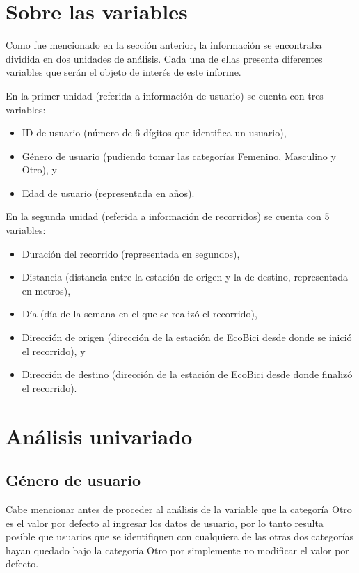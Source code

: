 \documentclass[11pt]{article}
\begin{document}
\section{Sobre las variables}
Como fue mencionado en la secci\'on anterior, la informaci\'on se encontraba dividida en dos unidades de an\'alisis.
Cada una de ellas presenta diferentes variables que ser\'an el objeto de inter\'es de este informe.
\par
En la primer unidad (referida a informaci\'on de usuario) se cuenta con tres variables: 
\begin{itemize}
    \item ID de usuario (n\'umero de 6 d\'igitos que identifica un usuario), 
    \item G\'enero de usuario (pudiendo tomar las categor\'ias Femenino, Masculino y Otro), y
    \item Edad de usuario (representada en a\~{n}os).
\end{itemize}

\par
En la segunda unidad (referida a informaci\'on de recorridos) se cuenta con 5 variables: 

\begin{itemize}
    \item Duraci\'on del recorrido (representada en segundos), 
    \item Distancia (distancia entre la estaci\'on de origen y la de destino, representada en metros), 
    \item D\'ia (d\'ia de la semana en el que se realiz\'o el recorrido), 
    \item Direcci\'on de origen (direcci\'on de la estaci\'on de EcoBici desde donde se inici\'o el recorrido), y
    \item Direcci\'on de destino (direcci\'on de la estaci\'on de EcoBici desde donde finaliz\'o el recorrido). 
\end{itemize}

\section{An\'alisis univariado}

\subsection{G\'enero de usuario}

Cabe mencionar antes de proceder al an\'alisis de la variable que la categor\'ia Otro es el valor por defecto
al ingresar los datos de usuario, por lo tanto resulta posible que usuarios que se identifiquen con cualquiera
de las otras dos categor\'ias hayan quedado bajo la categor\'ia Otro por simplemente no modificar el valor por defecto.
\end{document}
